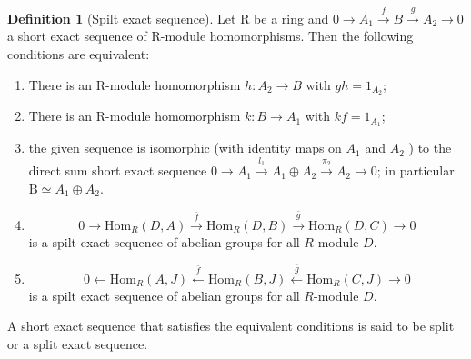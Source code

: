 \documentclass[a4paper,12pt]{article}
\newcommand{\rarr}[1]{\xrightarrow{#1}}
\newcommand{\larr}[1]{\xleftarrow{#1}}
\theoremstyle{definition}
\newtheorem{defn}{Definition}[subsection]
\begin{document}
\begin{defn}[Spilt exact sequence]
    Let $\mathrm{R}$ be a ring and $0 \rightarrow A_1 \xrightarrow{f} B \xrightarrow{g}  A_2 \rightarrow 0$ a short exact sequence of $\mathrm{R}$-module homomorphisms. Then the following conditions are equivalent:
    \begin{enumerate}[(1)]
        \item There is an $\mathrm{R}$-module homomorphism $h:  A_2 \rightarrow B $ with $gh=1_{A_2}$;
        \item There is an $\mathrm{R}$-module homomorphism $k: B \rightarrow A_1$ with $kf=1_{A_1}$;
        \item the given sequence is isomorphic (with identity maps on $A_1$ and $A_2$ ) to the direct sum short exact sequence $0 \rightarrow A_1 \rarr{l_1} A_1 \oplus A_2 \rarr{\pi_2} A_2 \rightarrow 0$; in particular $\mathrm{B} \simeq A_1 \oplus A_2$.
        \item $$0 \rightarrow \text{Hom}_R (D,A) \rarr{\bar{f}} \text{Hom}_R (D,B) \rarr{\bar{g}} \text{Hom}_R (D,C) \rightarrow 0$$ is a spilt exact sequence of abelian
              groups for all $R$-module $D$.
        \item $$0 \leftarrow \text{Hom}_R (A,J) \larr{\bar{f}} \text{Hom}_R (B,J) \larr{\bar{g}} \text{Hom}_R (C,J) \rightarrow 0$$ is a spilt exact sequence of abelian
              groups for all $R$-module $D$.
    \end{enumerate}
    A short exact sequence that satisfies the equivalent conditions is
    said to be split or a split exact sequence.
    \label{definition:spilt}
\end{defn}
\end{document}
